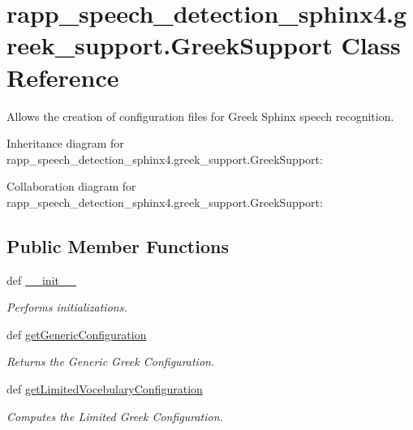 \hypertarget{classrapp__speech__detection__sphinx4_1_1greek__support_1_1GreekSupport}{\section{rapp\-\_\-speech\-\_\-detection\-\_\-sphinx4.\-greek\-\_\-support.\-Greek\-Support Class Reference}
\label{classrapp__speech__detection__sphinx4_1_1greek__support_1_1GreekSupport}
}


Allows the creation of configuration files for Greek Sphinx speech recognition.  




Inheritance diagram for rapp\-\_\-speech\-\_\-detection\-\_\-sphinx4.\-greek\-\_\-support.\-Greek\-Support\-:


Collaboration diagram for rapp\-\_\-speech\-\_\-detection\-\_\-sphinx4.\-greek\-\_\-support.\-Greek\-Support\-:
\subsection*{Public Member Functions}
\begin{DoxyCompactItemize}
\item 
def \hyperlink{classrapp__speech__detection__sphinx4_1_1greek__support_1_1GreekSupport_a11ade953742b11f592db3fdee75d97c1}{\-\_\-\-\_\-init\-\_\-\-\_\-}
\begin{DoxyCompactList}\small\item\em Performs initializations. \end{DoxyCompactList}\item 
def \hyperlink{classrapp__speech__detection__sphinx4_1_1greek__support_1_1GreekSupport_a829373d5fda0c238f8a0b799e380a766}{get\-Generic\-Configuration}
\begin{DoxyCompactList}\small\item\em Returns the Generic Greek Configuration. \end{DoxyCompactList}\item 
def \hyperlink{classrapp__speech__detection__sphinx4_1_1greek__support_1_1GreekSupport_aaf3225dba3273dbd5fd7b01944e20289}{get\-Limited\-Vocebulary\-Configuration}
\begin{DoxyCompactList}\small\item\em Computes the Limited Greek Configuration. \end{DoxyCompactList}\end{DoxyCompactItemize}
